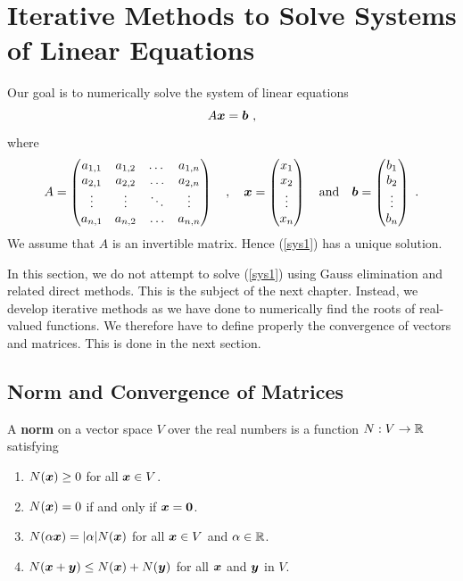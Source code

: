\chapter{Iterative Methods to Solve Systems of Linear Equations}
\label{chaptSeqB}

Our goal is to numerically solve the system of linear equations
\begin{equation}
A \bm{x} = \bm{b} \ , \label{sys1}
\end{equation}
where
\begin{equation} \label{matrixA}
A = \begin{pmatrix}
a_{1,1} & a_{1,2} & \dots & a_{1,n} \\
a_{2,1} & a_{2,2} & \ldots & a_{2,n} \\
\vdots & \vdots & \ddots & \vdots \\
a_{n,1} & a_{n,2} & \ldots & a_{n,n}
\end{pmatrix}
\quad, \quad
\bm{x} = \begin{pmatrix}
x_1 \\ x_2 \\ \vdots \\ x_n
\end{pmatrix}
\quad \text{and}\quad
\bm{b} = \begin{pmatrix}
b_1 \\ b_2 \\ \vdots \\ b_n
\end{pmatrix} \ .
\end{equation}
We assume that $A$ is an invertible matrix.  Hence (\ref{sys1}) has a
unique solution.

In this section, we do not attempt to solve (\ref{sys1}) using Gauss
elimination and related direct methods.  This is the subject of the
next chapter.  Instead, we develop iterative methods
as we have done to numerically find the roots of real-valued
functions.  We therefore have to define properly the convergence
of vectors and matrices.  This is done in the next section.

\section{Norm and Convergence of Matrices} \label{iter_LE_review}

\begin{defn}
A {\bfseries norm} on a vector space $V$ over the real
numbers is a function $N:V \rightarrow \mathbb{R}$ satisfying
\begin{enumerate}
\item $N(\bm{x}) \geq 0$ for all $\bm{x} \in V$.
\item $N(\bm{x}) = 0$ if and only if $\bm{x} = \bm{0}$.
\item $N(\alpha \bm{x}) = |\alpha|N(\bm{x})$ for all
$\bm{x} \in V$ and $\alpha \in \mathbb{R}$.
\item $N(\bm{x} + \bm{y}) \leq N(\bm{x}) + N(\bm{y})$ for all
$\bm{x}$ and $\bm{y}$ in $V$.
\end{enumerate}
\end{defn}

